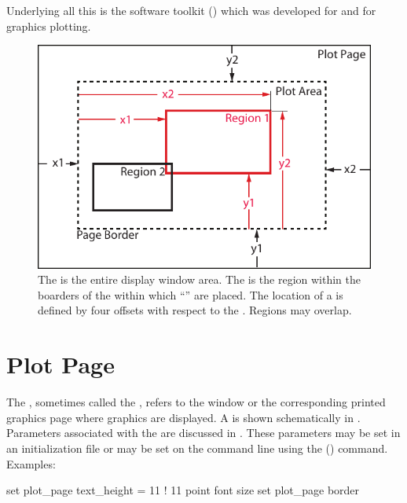 Underlying all this is the  software toolkit () which was developed
for \bmad and \tao for graphics plotting.


\begin{figure}[bt]
  \centering
  \includegraphics{plot-page.pdf}
  \caption[The plot window.]{The  is the entire display window area. The  
is the region within the boarders of the  within which ``'' are
placed. The location of a  is defined by four offsets with respect to the . Regions may overlap.}
  \label{f:plot.page}
\end{figure}

\section{Plot Page}
\label{s:plot.page.def}

The , sometimes called the , refers to the window or the corresponding
printed graphics page where graphics are displayed. A  is shown schematically in
. Parameters associated with the  are discussed in
.  These parameters may be set in an initialization file or may be set on the \tao
command line using the  () command. Examples:
\begin{example}
  set plot_page text_height = 11  ! 11 point font size
  set plot_page border%
\end{example}

